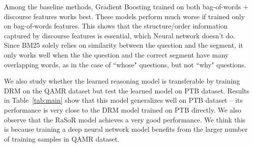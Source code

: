 Among the baseline methods, Gradient Boosting trained on both bag-of-words + discourse features works best. These models perform much worse if trained only on bag-of-words features. This shows that the structure/order information captured by discourse features is essential, which Neural network doesn't do. 
Since BM25 solely relies on similarity between the question and the segment, it only works well when the the question and the correct segment have many overlapping words, as in the case of ``whose" questions, but not ``why" questions.

We also study whether the learned reasoning model is transferable by training DRM on the QAMR dataset but test the learned model on PTB dataset. Results in Table~\ref{tab:main} show that this model generalizes well on PTB dataset -- its performance is very close to the DRM model trained on PTB directly. We also observe that the RaSoR model achieves a very good performance. We think this is because training a deep neural network model benefits from the larger number of training samples in QAMR dataset. 


